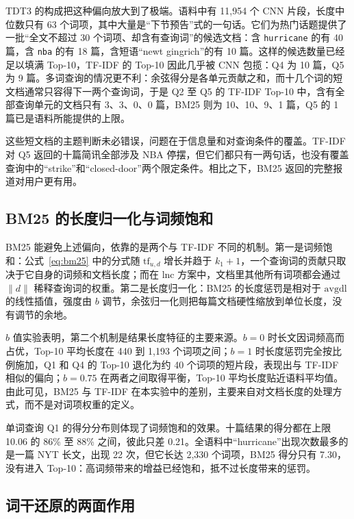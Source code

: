 \documentclass[12pt,a4paper]{ctexart}
\begin{document}
TDT3 的构成把这种偏向放大到了极端。语料中有 11,954 个 CNN 片段，长度中位数只有 63 个词项，其中大量是“下节预告”式的一句话。它们为热门话题提供了一批“全文不超过 30 个词项、却含有查询词”的候选文档：含 \texttt{hurricane} 的有 40 篇，含 \texttt{nba} 的有 18 篇，含短语“newt gingrich”的有 10 篇。这样的候选数量已经足以填满 Top-10，TF-IDF 的 Top-10 因此几乎被 CNN 包揽：Q4 为 10 篇，Q5 为 9 篇。多词查询的情况更不利：余弦得分是各单元贡献之和，而十几个词的短文档通常只容得下一两个查询词，于是 Q2 至 Q5 的 TF-IDF Top-10 中，含有全部查询单元的文档只有 3、3、0、0 篇，BM25 则为 10、10、9、1 篇，Q5 的 1 篇已是语料所能提供的上限。

这些短文档的主题判断未必错误，问题在于信息量和对查询条件的覆盖。TF-IDF 对 Q5 返回的十篇简讯全部涉及 NBA 停摆，但它们都只有一两句话，也没有覆盖查询中的“strike”和“closed-door”两个限定条件。相比之下，BM25 返回的完整报道对用户更有用。

\subsection{BM25 的长度归一化与词频饱和}

BM25 能避免上述偏向，依靠的是两个与 TF-IDF 不同的机制。第一是词频饱和：公式~\eqref{eq:bm25} 中的分式随 $\mathrm{tf}_{u,d}$ 增长并趋于 $k_1 + 1$，一个查询词的贡献只取决于它自身的词频和文档长度；而在 lnc 方案中，文档里其他所有词项都会通过 $\lVert d \rVert$ 稀释查询词的权重。第二是长度归一化：BM25 的长度惩罚是相对于 $\mathrm{avgdl}$ 的线性插值，强度由 $b$ 调节，余弦归一化则把每篇文档硬性缩放到单位长度，没有调节的余地。

$b$ 值实验表明，第二个机制是结果长度特征的主要来源。$b = 0$ 时长文因词频高而占优，Top-10 平均长度在 440 到 1,193 个词项之间；$b = 1$ 时长度惩罚完全按比例施加，Q1 和 Q4 的 Top-10 退化为约 40 个词项的短片段，表现出与 TF-IDF 相似的偏向；$b = 0.75$ 在两者之间取得平衡，Top-10 平均长度贴近语料平均值。由此可见，BM25 与 TF-IDF 在本实验中的差别，主要来自对文档长度的处理方式，而不是对词项权重的定义。

单词查询 Q1 的得分分布则体现了词频饱和的效果。十篇结果的得分都在上限 10.06 的 86\% 至 88\% 之间，彼此只差 0.21。全语料中“hurricane”出现次数最多的是一篇 NYT 长文，出现 22 次，但它长达 2,330 个词项，BM25 得分只有 7.30，没有进入 Top-10：高词频带来的增益已经饱和，抵不过长度带来的惩罚。

\subsection{词干还原的两面作用}
\end{document}
